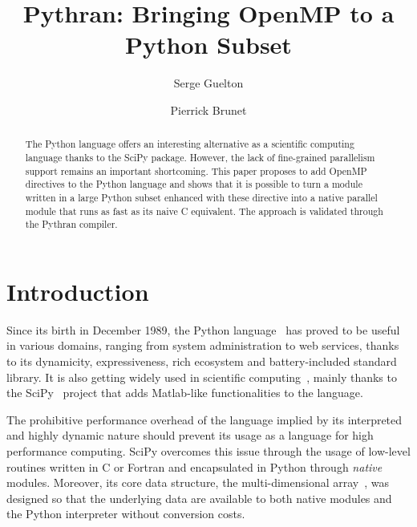 \documentclass{llncs}
\begin{document}
%
\title{Pythran: Bringing OpenMP to a Python Subset}

\author{Serge Guelton \and Pierrick Brunet}


\maketitle

%
\begin{abstract}

    The Python language offers an interesting alternative as a scientific
    computing language thanks to the SciPy package. However, the lack of
    fine-grained parallelism support remains an important shortcoming. This
    paper proposes to add OpenMP directives to the Python language and shows
    that it is possible to turn a module written in a large Python subset
    enhanced with these directive into a native parallel module that runs as
    fast as its naive C equivalent. The approach is validated through the
    Pythran compiler.

\end{abstract}

%
\section{Introduction}

Since its birth in December 1989, the Python language~\cite{rossum97} has proved
to be useful in various domains, ranging from system administration to web
services, thanks to its dynamicity, expressiveness, rich ecosystem and
battery-included standard library. It is also getting widely used in scientific
computing~\cite{Oliphant2007}, mainly thanks to the SciPy~\cite{scipy} project
that adds Matlab-like functionalities to the language.

The prohibitive performance overhead of the language implied by its interpreted
and highly dynamic nature should prevent its usage as a language for high
performance computing. SciPy overcomes this issue through the usage of low-level
routines written in C or Fortran and encapsulated in Python through
\emph{native} modules. Moreover, its core data structure, the multi-dimensional
array~\cite{numpyarray2011}, was designed so that the underlying data are
available to both native modules and the Python interpreter without conversion
costs.
\end{document}
